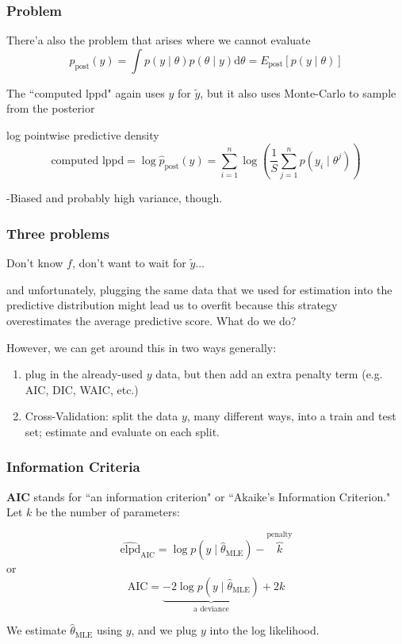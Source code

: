 \documentclass{beamer}
\begin{document}
\begin{frame}
\frametitle{Problem}

There'a also the problem that arises where we cannot evaluate 
\[
p_{\text{post}}(y) = \int p(y \mid \theta) p(\theta \mid y) \text{d}\theta = E_{\text{post}}[p(y \mid \theta)]
\]

The ``computed lppd" again uses $y$ for $\tilde{y}$, but it also uses Monte-Carlo to sample from the posterior 
\begin{block}{log pointwise predictive density}
\[
\text{computed lppd} = \log \hat{p}_{\text{post}}(y) = \sum_{i=1}^n \log \left( \frac{1}{S} \sum_{j=1}^n p(y_i \mid \theta^j) \right) 
\]
\end{block}

-Biased and probably high variance, though.

\end{frame}



\begin{frame}
\frametitle{Three problems}

Don't know $f$, don't want to wait for $\tilde{y}$...
\newline

and unfortunately, plugging the same data that we used for estimation into the predictive distribution might lead us to overfit because this strategy overestimates the average predictive score. What do we do?
\newline
\pause

However, we can get around this in two ways generally:
\begin{enumerate}
\item plug in the already-used $y$ data, but then add an extra penalty term (e.g. AIC, DIC, WAIC, etc.)
\item Cross-Validation: split the data $y$, many different ways, into a train and test set; estimate and evaluate on each split.
\end{enumerate}

\end{frame}

\begin{frame}
\frametitle{Information Criteria}

{\bf AIC} stands for ``an information criterion" or ``Akaike's Information Criterion." Let $k$ be the number of parameters:
\newline

\[
\widehat{\text{elpd}}_{\text{AIC}} = \log p(y \mid \hat{\theta}_{\text{MLE}}) - \overbrace{k}^{\text{penalty}}
\]
or
\[
\text{AIC} = \underbrace{-2\log p(y \mid \hat{\theta}_{\text{MLE}})}_{\text{a deviance}} +2 k
\]

We estimate $\hat{\theta}_{\text{MLE}}$ using $y$, \*and\* we plug $y$ into the log likelihood. 

\end{frame}
\end{document}
